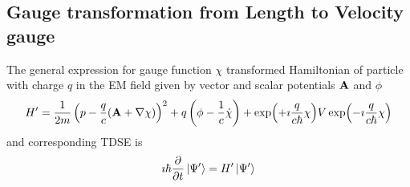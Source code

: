 \documentclass[11pt]{article}
\begin{document}
\subsection{ Gauge transformation from Length to Velocity gauge }

The general expression for gauge function $\chi$ transformed Hamiltonian of particle with charge $q$ in  the EM field given by vector and scalar potentials  $\vb A$ and $\phi$
\begin{equation}
    H'=  \frac{1}{2m} \left(p-\frac{q}{c}(\vb A +\nabla \chi) \right)^2  + q\left( \phi  - \frac{1}{c} \dot \chi \right)   +  \exp(+\imath \frac{q}{c\hbar}\chi)  V \exp(-\imath \frac{q}{c\hbar}\chi)    
    \label{eq:hamiltonian_general_gauge}
\end{equation}
and corresponding  TDSE is
\begin{equation}
\imath \hbar \pdv{}{t} \ket{\Psi'} = H'  \ket{\Psi'} 
\end{equation}
\end{document}

